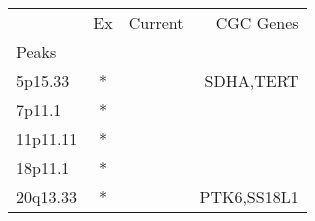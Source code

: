 \begin{tabular}{lccr}
\toprule
{} & Ex & Current &    CGC Genes \\
Peaks    &    &         &              \\
\midrule
5p15.33  &  * &         &    SDHA,TERT \\
7p11.1   &  * &         &              \\
11p11.11 &  * &         &              \\
18p11.1  &  * &         &              \\
20q13.33 &  * &         &  PTK6,SS18L1 \\
\bottomrule
\end{tabular}
